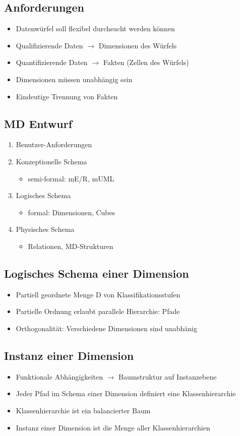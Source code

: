 \subsection{Anforderungen}
\begin{itemize}
	\item Datenwürfel soll flexibel durchsucht werden können
	\item Qualifizierende Daten $\rightarrow$ Dimensionen des Würfels
	\item Quantifizierende Daten $\rightarrow$ Fakten (Zellen des Würfels)
	\item Dimensionen müssen unabhängig sein
	\item Eindeutige Trennung von Fakten
\end{itemize}
\subsection{MD Entwurf}
\begin{enumerate}
  \item Benutzer-Anforderungen
  \item Konzeptionelle Schema
  	\begin{itemize}
		\item semi-formal: mE/R, mUML
	\end{itemize}
  \item Logisches Schema
  	\begin{itemize}
		\item formal: Dimensionen, Cubes
	\end{itemize}
  \item Physisches Schema
  	\begin{itemize}
		\item Relationen, MD-Strukturen
	\end{itemize}
\end{enumerate}
\subsection{Logisches Schema einer Dimension}
\begin{itemize}
	\item Partiell geordnete Menge D von Klassifikationsstufen
	\item Partielle Ordnung erlaubt parallele Hierarchie: \glqq{}Pfade\grqq{}
	\item Orthogonalität: Verschiedene Dimensionen sind unabhänig
\end{itemize}
\subsection{Instanz einer Dimension}
\begin{itemize}
	\item Funktionale Abhängigkeiten $\rightarrow$ Baumstruktur auf Instanzebene
	\item Jeder Pfad im Schema einer Dimension definiert eine Klassenhierarchie
	\item Klassenhierarchie ist ein balancierter Baum
	\item Instanz einer Dimension ist die Menge aller Klassenhierarchien
\end{itemize}
